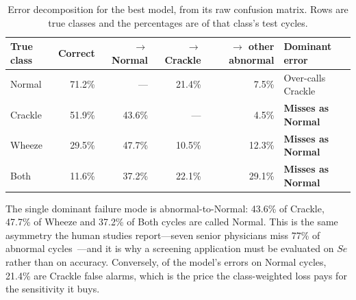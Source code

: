 \documentclass[journal,onecolumn]{IEEEtran}
\newcommand{\best}[1]{\textbf{#1}}
\begin{document}
\begin{table}[!t]
\centering
\caption{Error decomposition for the best model, from its raw confusion matrix.
Rows are true classes and the percentages are of that class's test cycles.}
\label{tab:errors}
\small
\begin{tabular}{lrrrrl}
\toprule
True class & Correct & $\rightarrow$ Normal & $\rightarrow$ Crackle & $\rightarrow$ other abnormal & Dominant error \\
\midrule
Normal  & 71.2\% & --- & 21.4\% & \phantom{0}7.5\% & Over-calls Crackle \\
Crackle & 51.9\% & 43.6\% & --- & \phantom{0}4.5\% & \best{Misses as Normal} \\
Wheeze  & 29.5\% & 47.7\% & 10.5\% & 12.3\% & \best{Misses as Normal} \\
Both    & 11.6\% & 37.2\% & 22.1\% & 29.1\% & \best{Misses as Normal} \\
\bottomrule
\end{tabular}

\vspace{2pt}
\footnotesize The single dominant failure mode is abnormal-to-Normal: 43.6\% of
Crackle, 47.7\% of Wheeze and 37.2\% of Both cycles are called Normal. This is the
same asymmetry the human studies report---seven senior physicians miss 77\% of
abnormal cycles~\cite{tzeng2025jmir}---and it is why a screening application must
be evaluated on $Se$ rather than on accuracy. Conversely, of the model's errors on
Normal cycles, 21.4\% are Crackle false alarms, which is the price the
class-weighted loss pays for the sensitivity it buys.
\end{table}
\end{document}
